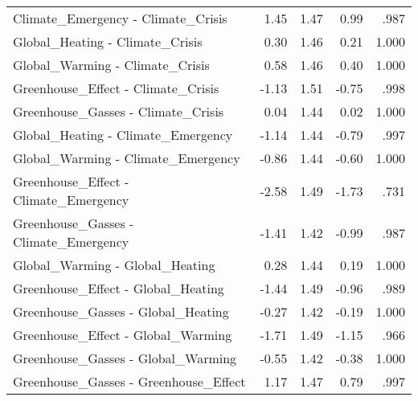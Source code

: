 \begin{table}[ht]
\begin{tabular}{lrrrr}
  Climate\_Emergency - Climate\_Crisis & 1.45 & 1.47 & 0.99 & .987 \\ 
  Global\_Heating - Climate\_Crisis & 0.30 & 1.46 & 0.21 & 1.000 \\ 
  Global\_Warming - Climate\_Crisis & 0.58 & 1.46 & 0.40 & 1.000 \\ 
  Greenhouse\_Effect - Climate\_Crisis & -1.13 & 1.51 & -0.75 & .998 \\ 
  Greenhouse\_Gasses - Climate\_Crisis & 0.04 & 1.44 & 0.02 & 1.000 \\ 
  Global\_Heating - Climate\_Emergency & -1.14 & 1.44 & -0.79 & .997 \\ 
  Global\_Warming - Climate\_Emergency & -0.86 & 1.44 & -0.60 & 1.000 \\ 
  Greenhouse\_Effect - Climate\_Emergency & -2.58 & 1.49 & -1.73 & .731 \\ 
  Greenhouse\_Gasses - Climate\_Emergency & -1.41 & 1.42 & -0.99 & .987 \\ 
  Global\_Warming - Global\_Heating & 0.28 & 1.44 & 0.19 & 1.000 \\ 
  Greenhouse\_Effect - Global\_Heating & -1.44 & 1.49 & -0.96 & .989 \\ 
  Greenhouse\_Gasses - Global\_Heating & -0.27 & 1.42 & -0.19 & 1.000 \\ 
  Greenhouse\_Effect - Global\_Warming & -1.71 & 1.49 & -1.15 & .966 \\ 
  Greenhouse\_Gasses - Global\_Warming & -0.55 & 1.42 & -0.38 & 1.000 \\ 
  Greenhouse\_Gasses - Greenhouse\_Effect & 1.17 & 1.47 & 0.79 & .997 \\ 
   \hline
\end{tabular}
\end{table}
